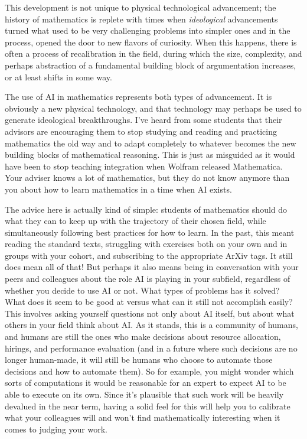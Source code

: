 \documentclass[11pt,reqno]{amsart}
\theoremstyle{plain}
\theoremstyle{definition}
\numberwithin{equation}{section}
\numberwithin{theorem}{section}
\begin{document}
This development is not unique to physical technological advancement; the history of mathematics is replete with times when \textit{ideological} advancements turned what used to be very challenging problems into simpler ones and in the process, opened the door to new flavors of curiosity. When this happens, there is often a process of recalibration in the field, during which the size, complexity, and perhaps abstraction of a fundamental building block of argumentation increases, or at least shifts in some way. 

The use of AI in mathematics represents both types of advancement. It is obviously a new physical technology, and that technology may perhaps be used to generate ideological breakthroughs. I’ve heard from some students that their advisors are encouraging them to stop studying and reading and practicing mathematics the old way and to adapt completely to whatever becomes the new building blocks of mathematical reasoning. This is just as misguided as it would have been to stop teaching integration when Wolfram released Mathematica. Your adviser knows a lot of mathematics, but they do not know anymore than you about how to learn mathematics in a time when AI exists. 

The advice here is actually kind of simple: students of mathematics should do what they can to keep up with the trajectory of their chosen field, while simultaneously following best practices for how to learn. In the past, this meant reading the standard texts, struggling with exercises both on your own and in groups with your cohort, and subscribing to the appropriate ArXiv tags. It still does mean all of that! But perhaps it also means being in conversation with your peers and colleagues about the role AI is playing in your subfield, regardless of whether you decide to use AI or not. What types of problems has it solved? What does it seem to be good at versus what can it still not accomplish easily? This involves asking yourself questions not only about AI itself, but about what others in your field think about AI. As it stands, this is a community of humans, and humans are still the ones who make decisions about resource allocation, hirings, and performance evaluation (and in a future where such decisions are no longer human-made, it will still be humans who choose to automate those decisions and how to automate them). So for example, you might wonder which sorts of computations it would be reasonable for an expert to expect AI to be able to execute on its own. Since it’s plausible that such work will be heavily devalued in the near term, having a solid feel for this will help you to calibrate what your colleagues will and won’t find mathematically interesting when it comes to judging your work. 
\end{document}
